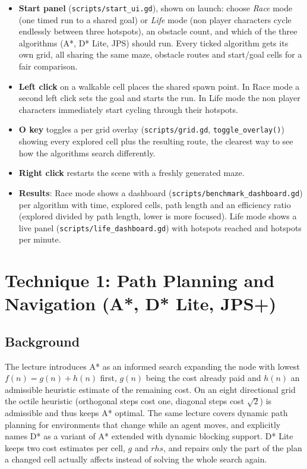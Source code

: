 \documentclass[11pt,a4paper]{article}
\begin{document}
\begin{itemize}[leftmargin=1.2em]
    \item \textbf{Start panel} (\texttt{scripts/start\_ui.gd}), shown on launch: choose \emph{Race} mode (one timed run to a shared goal) or \emph{Life} mode (non player characters cycle endlessly between three hotspots), an obstacle count, and which of the three algorithms (A*, D* Lite, JPS) should run. Every ticked algorithm gets its own grid, all sharing the same maze, obstacle routes and start/goal cells for a fair comparison.
    \item \textbf{Left click} on a walkable cell places the shared spawn point. In Race mode a second left click sets the goal and starts the run. In Life mode the non player characters immediately start cycling through their hotspots.
    \item \textbf{O key} toggles a per grid overlay (\texttt{scripts/grid.gd}, \texttt{toggle\_overlay()}) showing every explored cell plus the resulting route, the clearest way to see how the algorithms search differently.
    \item \textbf{Right click} restarts the scene with a freshly generated maze.
    \item \textbf{Results}: Race mode shows a dashboard (\texttt{scripts/benchmark\_dashboard.gd}) per algorithm with time, explored cells, path length and an efficiency ratio (explored divided by path length, lower is more focused). Life mode shows a live panel (\texttt{scripts/life\_dashboard.gd}) with hotspots reached and hotspots per minute.
\end{itemize}

\section{Technique 1: Path Planning and Navigation (A*, D* Lite, JPS+)}

\subsection{Background}

The lecture introduces A* as an informed search expanding the node with lowest $f(n) = g(n) + h(n)$ first, $g(n)$ being the cost already paid and $h(n)$ an admissible heuristic estimate of the remaining cost. On an eight directional grid the octile heuristic (orthogonal steps cost one, diagonal steps cost $\sqrt{2}$) is admissible and thus keeps A* optimal. The same lecture covers dynamic path planning for environments that change while an agent moves, and explicitly names D* as a variant of A* extended with dynamic blocking support. D* Lite keeps two cost estimates per cell, $g$ and $rhs$, and repairs only the part of the plan a changed cell actually affects instead of solving the whole search again.
\end{document}
